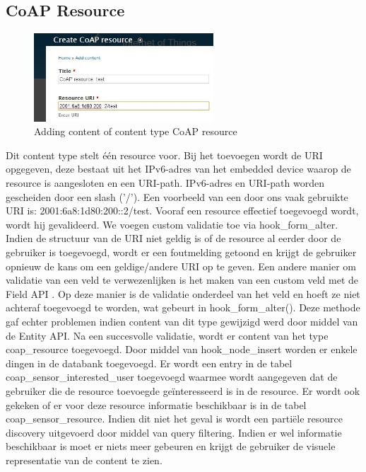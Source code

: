 \subsection{CoAP Resource}
\begin{figure}
\vspace{-10pt}
\centering
\label{fig:addCoapResource}
\includegraphics[width=0.6\textwidth]{fig/add_coap_resource}
\vspace{-20pt}
\centering
\caption{Adding content of content type CoAP resource}
\centering
\vspace{-10pt}
\end{figure}
Dit content type stelt \'{e}\'{e}n resource voor. Bij het toevoegen wordt de URI opgegeven, deze bestaat uit het IPv6-adres van het embedded device waarop de resource is aangesloten en een URI-path. IPv6-adres en URI-path worden gescheiden door een slash ('/'). Een voorbeeld van een door ons vaak gebruikte URI is: 2001:6a8:1d80:200::2/test. Vooraf een resource effectief toegevoegd wordt, wordt hij gevalideerd. We voegen custom validatie toe via hook\_form\_alter. Indien de structuur van de URI niet geldig is of de resource al eerder door de gebruiker is toegevoegd, wordt er een foutmelding getoond en krijgt de gebruiker opnieuw de kans om een geldige/andere URI op te geven. Een andere manier om validatie van een veld te verwezenlijken is het maken van een custom veld met de Field API \cite{fieldAPI}. Op deze manier is de validatie onderdeel van het veld en hoeft ze niet achteraf toegevoegd te worden, wat gebeurt in hook\_form\_alter(). Deze methode gaf echter problemen indien content van dit type gewijzigd werd door middel van de Entity API. Na een succesvolle validatie, wordt er content van het type coap\_resource toegevoegd. Door middel van hook\_node\_insert worden er enkele dingen in de databank toegevoegd. Er wordt een entry in de tabel coap\_sensor\_interested\_user toegevoegd waarmee wordt aangegeven dat de gebruiker die de resource toevoegde ge\"{i}nteresseerd is in de resource. Er wordt ook gekeken of er voor deze resource informatie beschikbaar is in de tabel coap\_sensor\_resource. Indien dit niet het geval is wordt een parti\"{e}le resource discovery uitgevoerd door middel van query filtering. Indien er wel informatie beschikbaar is moet er niets meer gebeuren en krijgt de gebruiker de visuele representatie van de content te zien.\\

